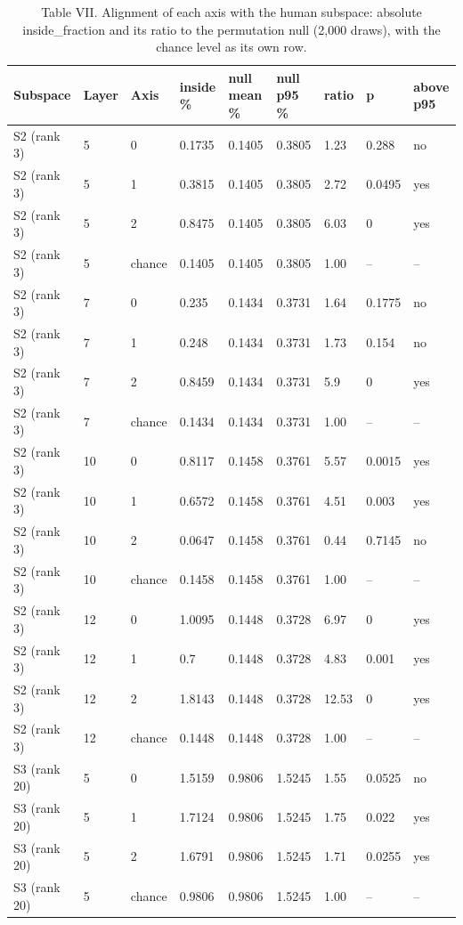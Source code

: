 \begin{table}[t]
\centering
\caption{Table VII. Alignment of each axis with the human subspace: absolute inside\_fraction and its ratio to the permutation null (2,000 draws), with the chance level as its own row.}
\label{tab:vii}
\begin{tabular}{lllllllll}
\toprule
Subspace & Layer & Axis & inside \% & null mean \% & null p95 \% & ratio & p & above p95 \\
\midrule
S2 (rank 3) & 5 & 0 & 0.1735 & 0.1405 & 0.3805 & 1.23 & 0.288 & no \\
S2 (rank 3) & 5 & 1 & 0.3815 & 0.1405 & 0.3805 & 2.72 & 0.0495 & yes \\
S2 (rank 3) & 5 & 2 & 0.8475 & 0.1405 & 0.3805 & 6.03 & 0 & yes \\
S2 (rank 3) & 5 & chance & 0.1405 & 0.1405 & 0.3805 & 1.00 & -- & -- \\
S2 (rank 3) & 7 & 0 & 0.235 & 0.1434 & 0.3731 & 1.64 & 0.1775 & no \\
S2 (rank 3) & 7 & 1 & 0.248 & 0.1434 & 0.3731 & 1.73 & 0.154 & no \\
S2 (rank 3) & 7 & 2 & 0.8459 & 0.1434 & 0.3731 & 5.9 & 0 & yes \\
S2 (rank 3) & 7 & chance & 0.1434 & 0.1434 & 0.3731 & 1.00 & -- & -- \\
S2 (rank 3) & 10 & 0 & 0.8117 & 0.1458 & 0.3761 & 5.57 & 0.0015 & yes \\
S2 (rank 3) & 10 & 1 & 0.6572 & 0.1458 & 0.3761 & 4.51 & 0.003 & yes \\
S2 (rank 3) & 10 & 2 & 0.0647 & 0.1458 & 0.3761 & 0.44 & 0.7145 & no \\
S2 (rank 3) & 10 & chance & 0.1458 & 0.1458 & 0.3761 & 1.00 & -- & -- \\
S2 (rank 3) & 12 & 0 & 1.0095 & 0.1448 & 0.3728 & 6.97 & 0 & yes \\
S2 (rank 3) & 12 & 1 & 0.7 & 0.1448 & 0.3728 & 4.83 & 0.001 & yes \\
S2 (rank 3) & 12 & 2 & 1.8143 & 0.1448 & 0.3728 & 12.53 & 0 & yes \\
S2 (rank 3) & 12 & chance & 0.1448 & 0.1448 & 0.3728 & 1.00 & -- & -- \\
S3 (rank 20) & 5 & 0 & 1.5159 & 0.9806 & 1.5245 & 1.55 & 0.0525 & no \\
S3 (rank 20) & 5 & 1 & 1.7124 & 0.9806 & 1.5245 & 1.75 & 0.022 & yes \\
S3 (rank 20) & 5 & 2 & 1.6791 & 0.9806 & 1.5245 & 1.71 & 0.0255 & yes \\
S3 (rank 20) & 5 & chance & 0.9806 & 0.9806 & 1.5245 & 1.00 & -- & -- \\

\end{tabular}
\end{table}
